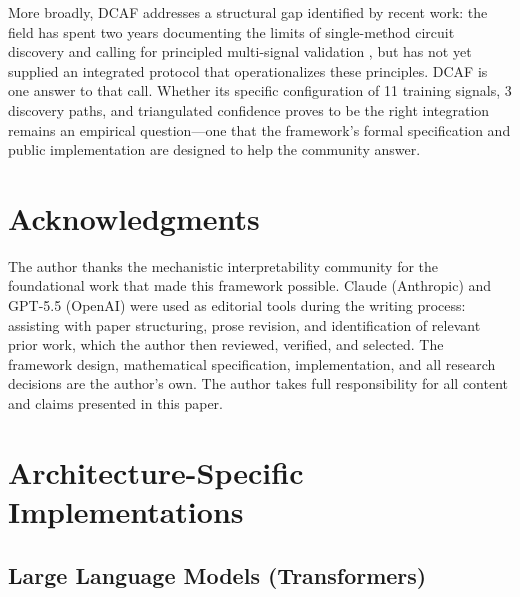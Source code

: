 \documentclass[11pt]{article}
\begin{document}
More broadly, DCAF addresses a structural gap identified by recent work: the field has spent two years documenting the limits of single-method circuit discovery \citep{meloux2025variance,zhang2024bestpractices} and calling for principled multi-signal validation \citep{sharkey2025openproblems,long2025triangulation}, but has not yet supplied an integrated protocol that operationalizes these principles. DCAF is one answer to that call. Whether its specific configuration of 11 training signals, 3 discovery paths, and triangulated confidence proves to be the right integration remains an empirical question---one that the framework's formal specification and public implementation are designed to help the community answer.

\section*{Acknowledgments}

The author thanks the mechanistic interpretability community for the foundational work that made this framework possible. Claude (Anthropic) and GPT-5.5 (OpenAI) were used as editorial tools during the writing process: assisting with paper structuring, prose revision, and identification of relevant prior work, which the author then reviewed, verified, and selected. The framework design, mathematical specification, implementation, and all research decisions are the author's own. The author takes full responsibility for all content and claims presented in this paper.




\appendix

\section{Architecture-Specific Implementations}
\label{app:arch}

\subsection{Large Language Models (Transformers)}
\label{app:transformers}
\end{document}
